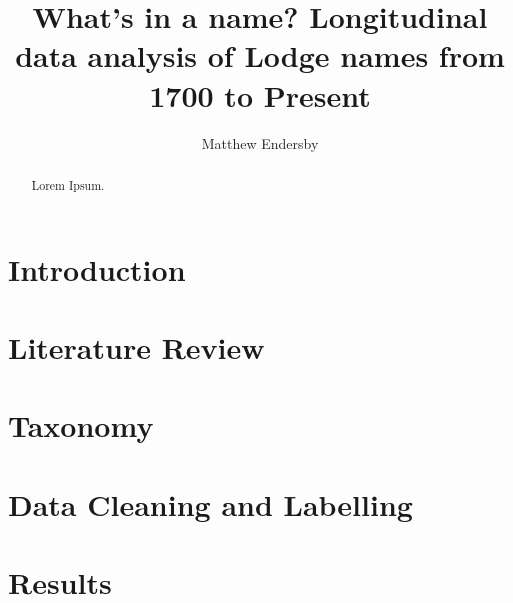 \documentclass[]{article}
\title{What's in a name? Longitudinal data analysis of Lodge names from 1700 to Present}
\author{Matthew Endersby}
\begin{document}


\maketitle

\begin{abstract}

Lorem Ipsum.

\end{abstract}

\section{Introduction}

\section{Literature Review}

\section{Taxonomy}

\section{Data Cleaning and Labelling}

\section{Results}

\citet{lanes} \\

\citep{serendipity}

\end{document}
